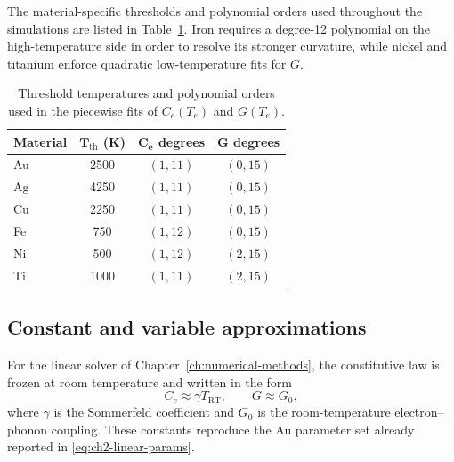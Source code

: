 The material-specific thresholds and polynomial orders used throughout
the simulations are listed in Table~\ref{tab:ch3-fitting-params}. Iron
requires a degree-12 polynomial on the high-temperature side in order to
resolve its stronger curvature, while nickel and titanium enforce
quadratic low-temperature fits for \(G\).

\begin{table}[htbp]
    \centering
    \caption{Threshold temperatures and polynomial orders used in the piecewise fits of \(C_e(T_e)\) and \(G(T_e)\).}
    \label{tab:ch3-fitting-params}
    \begin{tabular}{@{}lccc@{}}
        \toprule
        \rowcolor{gray!20}
        \textbf{Material} & \(\boldsymbol{T_{\mathrm{th}}}\) \textbf{(K)} & \(\boldsymbol{C_e}\) \textbf{degrees} & \(\boldsymbol{G}\) \textbf{degrees} \\
        \midrule
        Au                & 2500                                          & \((1, 11)\)                           & \((0, 15)\)                         \\
        Ag                & 4250                                          & \((1, 11)\)                           & \((0, 15)\)                         \\
        Cu                & 2250                                          & \((1, 11)\)                           & \((0, 15)\)                         \\
        Fe                & 750                                           & \((1, 12)\)                           & \((0, 15)\)                         \\
        Ni                & 500                                           & \((1, 12)\)                           & \((2, 15)\)                         \\
        Ti                & 1000                                          & \((1, 11)\)                           & \((2, 15)\)                         \\
        \bottomrule
    \end{tabular}
\end{table}

\subsection{Constant and variable approximations}
\label{sec:ch3-fitting-approx}

For the linear solver of Chapter~\ref{ch:numerical-methods}, the
constitutive law is frozen at room temperature and written in the form
\[
    C_e \approx \gamma T_{\mathrm{RT}},
    \qquad
    G \approx G_0,
\]
where \(\gamma\) is the Sommerfeld coefficient and \(G_0\) is the
room-temperature electron--phonon coupling. These constants reproduce the
Au parameter set already reported in \eqref{eq:ch2-linear-params}.

